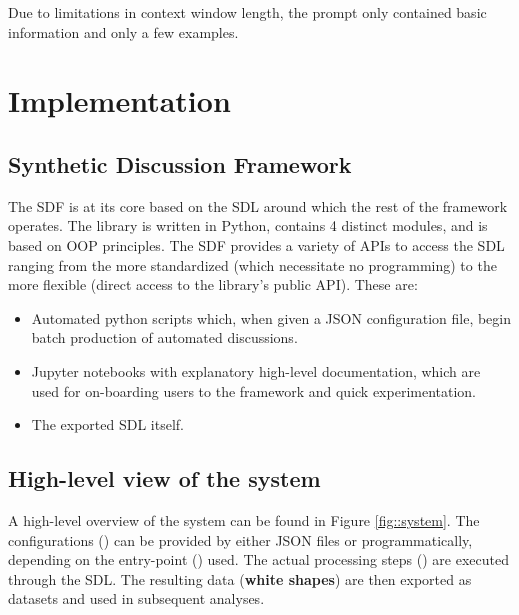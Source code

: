 Due to limitations in context window length, the prompt only contained basic information and only a few examples.

\section{Implementation}
\label{sec:system:implementation}

\subsection{Synthetic Discussion Framework}
\label{ssec:system:library}

The \ac{SDF} is at its core based on the \ac{SDL} around which the rest of the framework operates. The library is written in Python, contains 4 distinct modules, and is based on \ac{OOP} principles. The \ac{SDF} provides a variety of \acp{API} to access the \ac{SDL} ranging from the more standardized (which necessitate no programming) to the more flexible (direct access to the library's public \ac{API}). These are:

\begin{itemize}
	\item Automated python scripts which, when given a \ac{JSON} configuration file, begin batch production of automated discussions.
	
	\item Jupyter notebooks with explanatory high-level documentation, which are used for on-boarding users to the framework and quick experimentation.
	
	\item The exported \ac{SDL} itself.
\end{itemize}


\subsection{High-level view of the system}
\label{ssec:system:overview}

A high-level overview of the system can be found in Figure \ref{fig::system}. The configurations () can be provided by either \ac{JSON} files or programmatically, depending on the entry-point () used. The actual processing steps () are executed through the \ac{SDL}. The resulting data (\textbf{white shapes}) are then exported as datasets and used in subsequent analyses.

